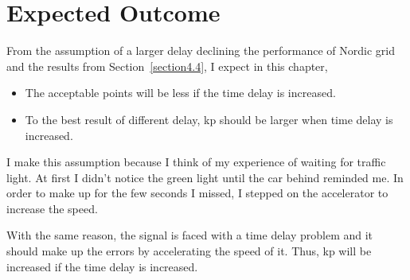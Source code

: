 \section{Expected Outcome} %
\label{section5.2}
From the assumption of a larger delay declining the performance of Nordic grid and the results from Section~\ref{section4.4}, I expect in this chapter, 

\begin{itemize}
    \item The acceptable points will be less if the time delay is increased.  
    \item To the best result of different delay, kp should be larger when time delay is increased.  
\end{itemize}


I make this assumption because I think of my experience of waiting for traffic light. At first I didn't notice the green light until the car behind reminded me. In order to make up for the few seconds I missed, I stepped on the accelerator to increase the speed.  

With the same reason, the signal is faced with a time delay problem and it should make up the errors by accelerating the speed of it. Thus, kp will be increased if the time delay is increased.  